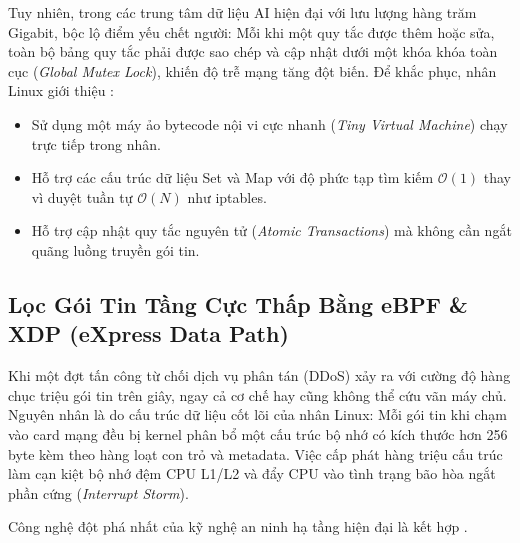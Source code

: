 Tuy nhiên, trong các trung tâm dữ liệu AI hiện đại với lưu lượng hàng trăm Gigabit,  bộc lộ điểm yếu chết người: Mỗi khi một quy tắc được thêm hoặc sửa, toàn bộ bảng quy tắc phải được sao chép và cập nhật dưới một khóa khóa toàn cục (\textit{Global Mutex Lock}), khiến độ trễ mạng tăng đột biến. Để khắc phục, nhân Linux giới thiệu :
\begin{itemize}
  \item Sử dụng một máy ảo bytecode nội vi cực nhanh (\textit{Tiny Virtual Machine}) chạy trực tiếp trong nhân.
  \item Hỗ trợ các cấu trúc dữ liệu Set và Map với độ phức tạp tìm kiếm $\mathcal{O}(1)$ thay vì duyệt tuần tự $\mathcal{O}(N)$ như iptables.
  \item Hỗ trợ cập nhật quy tắc nguyên tử (\textit{Atomic Transactions}) mà không cần ngắt quãng luồng truyền gói tin.
\end{itemize}

\subsection{Lọc Gói Tin Tầng Cực Thấp Bằng eBPF \& XDP (eXpress Data Path)}
Khi một đợt tấn công từ chối dịch vụ phân tán (DDoS) xảy ra với cường độ hàng chục triệu gói tin trên giây, ngay cả cơ chế  hay  cũng không thể cứu vãn máy chủ. Nguyên nhân là do cấu trúc dữ liệu cốt lõi của nhân Linux: Mỗi gói tin khi chạm vào card mạng đều bị kernel phân bổ một cấu trúc bộ nhớ  có kích thước hơn 256 byte kèm theo hàng loạt con trỏ và metadata. Việc cấp phát hàng triệu cấu trúc  làm cạn kiệt bộ nhớ đệm CPU L1/L2 và đẩy CPU vào tình trạng bão hòa ngắt phần cứng (\textit{Interrupt Storm}).

Công nghệ đột phá nhất của kỹ nghệ an ninh hạ tầng hiện đại là  kết hợp .

